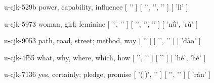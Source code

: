 \begin{multicols}{2}
\lettrine[lines=3]{\cjkgGlue{}}{}\begin{minipage}{0.8\linewidth} u-cjk-529b  power, capability, influence  [ '\cjkgGlue{}' ]  [ '\cjkgGlue{}', '\cjkgGlue{}', '\cjkgGlue{}' ]  [ 'lì' ] \end{minipage}

\lettrine[lines=3]{\cjkgGlue{}}{}\begin{minipage}{0.8\linewidth} u-cjk-5973  woman, girl; feminine  [ '\cjkgGlue{}', '\cjkgGlue{}' ]  [ '\cjkgGlue{}', '\cjkgGlue{}', '\cjkgGlue{}' ]  [ 'nǚ', 'rǔ' ] \end{minipage}

\lettrine[lines=3]{\cjkgGlue{}}{}\begin{minipage}{0.8\linewidth} u-cjk-9053  path, road, street; method, way  [ '\cjkgGlue{}' ]  [ '\cjkgGlue{}', '\cjkgGlue{}' ]  [ 'dào' ] \end{minipage}

\lettrine[lines=3]{\cjkgGlue{}}{}\begin{minipage}{0.8\linewidth} u-cjk-4f55  what, why, where, which, how  [ '\cjkgGlue{}', '\cjkgGlue{}' ]  [ '\cjkgGlue{}' ]  [ 'hé', 'hè' ] \end{minipage}

\lettrine[lines=3]{\cjkgGlue{}}{}\begin{minipage}{0.8\linewidth} u-cjk-7136  yes, certainly; pledge, promise  [ '\cjkgGlue{}(\cjkgGlue{}|\cjkgGlue{})', '\cjkgGlue{}' ]  [ '\cjkgGlue{}', '\cjkgGlue{}' ]  [ 'rán' ] \end{minipage}


\end{multicols}
